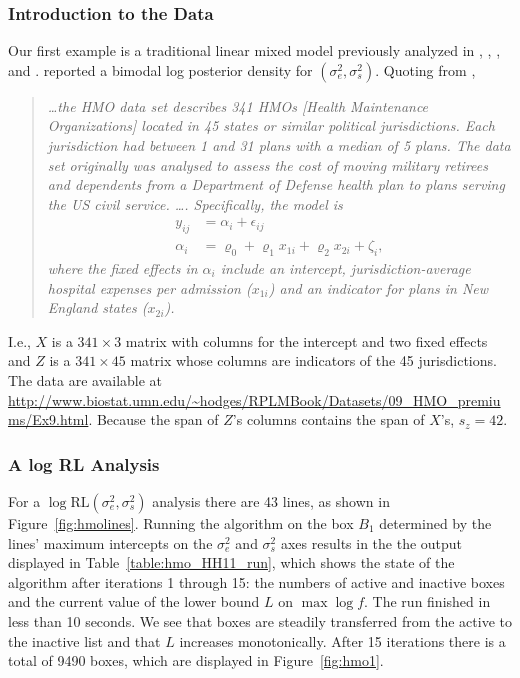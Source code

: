 \documentclass{report}
\newcommand{\RLorig}{\text{RL}}
\newcommand{\logRLorig}{\log\RLorig}
\newcommand{\sigssq}{\sigma_s^2}
\newcommand{\sigesq}{\sigma_e^2}
\newcommand{\logRLssorig}{\logRLorig(\sigesq,\sigssq)}
\begin{document}
\subsubsection{Introduction to the Data}
Our first example is a traditional linear mixed model previously analyzed in \citet{hodges:98},  \cite{wakefield:1998}, \cite{hodges:2013}, and \cite{henn&hodges:2014}. \cite{wakefield:1998} reported a bimodal log posterior density for $(\sigesq,\sigssq)$.  Quoting from \cite{henn&hodges:2014},
\begin{quote}
\itshape
\dots the HMO data set describes 341 HMOs [Health Maintenance Organizations] located in 45 states or similar political jurisdictions.  Each jurisdiction had between 1 and 31 plans with a median of 5 plans.  The data set originally was analysed to assess the cost of moving military retirees and dependents from a Department of Defense health plan to plans serving the US civil service.  \dots.  Specifically, the model is
\begin{equation*}
\begin{split}
	y_{ij} &= \alpha_i + \epsilon_{ij}\\
	\alpha_i &= \varrho_0 + \varrho_1x_{1i} + \varrho_2x_{2i} + \zeta_i,
\end{split}
\end{equation*}
where the fixed effects in $\alpha_i$ include an intercept, jurisdiction-average hospital expenses per admission ($x_{1i}$) and an indicator for plans in New England states ($x_{2i}$).

\upshape
\end{quote}
I.e., $X$ is a $341 \times 3$ matrix with columns for the intercept and two fixed effects and $Z$ is a $341 \times 45$ matrix whose columns are indicators of the 45 jurisdictions.  The data are available at \url{http://www.biostat.umn.edu/~hodges/RPLMBook/Datasets/09_HMO_premiums/Ex9.html}.  Because the span of $Z$'s columns contains the span of $X$'s, $s_z = 42$.  

\subsubsection{A log RL Analysis}
For a $\logRLssorig$ analysis there are 43 lines, as shown in Figure~\ref{fig:hmolines}.
Running the algorithm on the box $B_1$ determined by the lines' maximum intercepts on the $\sigesq$ and $\sigssq$ axes results in the the output displayed in Table~\ref{table:hmo_HH11_run}, which shows the state of the algorithm after iterations 1 through 15: the numbers of active and inactive boxes and the current value of the lower bound $L$ on $\max\log f$. The run finished in less than 10 seconds.  We see that boxes are steadily transferred from the active to the inactive list and that $L$ increases monotonically.  After 15 iterations there is a total of 9490 boxes, which are displayed in Figure~\ref{fig:hmo1}.
\end{document}
